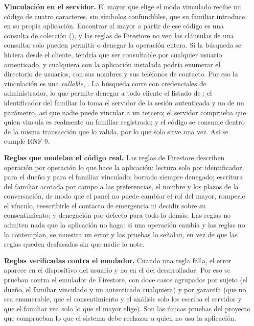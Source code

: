 \textbf{Vinculación en el servidor.} El mayor que elige el modo vinculado recibe un código de cuatro caracteres, sin símbolos confundibles, que su familiar introduce en su propia aplicación. Encontrar al mayor a partir de ese código es una consulta de colección (), y las reglas de Firestore no ven las cláusulas de una consulta: solo pueden permitir o denegar la operación entera. Si la búsqueda se hiciera desde el cliente,  tendría que ser consultable por cualquier usuario autenticado, y cualquiera con la aplicación instalada podría enumerar el directorio de usuarios, con sus nombres y sus teléfonos de contacto. Por eso la vinculación es una \emph{callable}, . La búsqueda corre con credenciales de administrador, lo que permite denegar a todo cliente el listado de ; el identificador del familiar lo toma el servidor de la sesión autenticada y no de un parámetro, así que nadie puede vincular a un tercero; el servidor comprueba que quien vincula es realmente un familiar registrado; y el código se consume dentro de la misma transacción que lo valida, por lo que solo sirve una vez. Así se cumple RNF-9.

\textbf{Reglas que modelan el código real.} Las reglas de Firestore describen operación por operación lo que hace la aplicación: lectura solo por identificador, para el dueño y para el familiar vinculado; borrado siempre denegado; escritura del familiar acotada por campo a las preferencias, el nombre y los plazos de la conversación, de modo que el panel no puede cambiar el rol del mayor, romperle el vínculo, reescribirle el contacto de emergencia ni decidir sobre su consentimiento; y denegación por defecto para todo lo demás. Las reglas no admiten nada que la aplicación no haga: si una operación cambia y las reglas no la contemplan, se muestra un error y las pruebas lo señalan, en vez de que las reglas queden desfasadas sin que nadie lo note.

\textbf{Reglas verificadas contra el emulador.} Cuando una regla falla, el error aparece en el dispositivo del usuario y no en el del desarrollador. Por eso se prueban contra el emulador de Firestore, con doce casos agrupados por sujeto (el dueño, el familiar vinculado y un autenticado cualquiera) y por garantía (que  no sea enumerable, que el consentimiento y el análisis solo los escriba el servidor y que el familiar vea solo lo que el mayor elige). Son las únicas pruebas del proyecto que comprueban lo que el sistema debe rechazar a quien no usa la aplicación.

